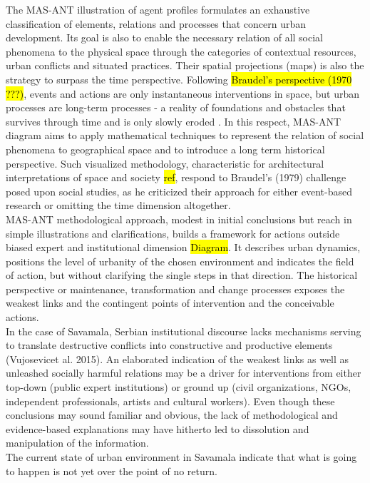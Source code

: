 \documentclass[11pt]{report}
\begin{document}
The MAS-ANT illustration of agent profiles formulates an exhaustive classification of elements, relations and processes that concern urban development.
Its goal is also to enable the necessary relation of all social phenomena to the physical space through the categories of contextual resources, urban conflicts and situated practices.
Their spatial projections (maps) is also the strategy to surpass the time perspective.
Following \hl{Braudel's perspective (1970 ???)}, events and actions are only instantaneous interventions in space, but urban processes are long-term processes - a reality of foundations and obstacles that
survives through time and is only slowly eroded \cite{Braudel 1970}.
In this respect, MAS-ANT diagram aims to apply mathematical  techniques to represent the  relation of social phenomena  to  geographical space and to introduce a  long term historical perspective.
Such visualized methodology, characteristic for architectural interpretations of space and society \hl{ref}, respond to Braudel's (1979) challenge posed upon social studies, as he criticized their approach for either event-based research or omitting the time dimension altogether.
\\
MAS-ANT methodological approach, modest in initial conclusions but reach in simple illustrations and clarifications, builds a framework for actions outside biased expert and institutional dimension \hl{Diagram}. It describes urban dynamics, positions the level of urbanity of the chosen environment and indicates the field of action, but without clarifying the single steps in that direction.
The historical perspective or maintenance, transformation and change processes exposes the weakest links and the contingent points of intervention and the conceivable actions. 
\\
In the case of Savamala, Serbian institutional discourse lacks mechanisms serving to translate destructive conflicts into constructive and productive elements (Vujosevicet al. 2015).
An elaborated indication of the weakest links as well as unleashed socially harmful relations may be a driver for interventions from either top-down (public expert institutions) or ground up (civil organizations, NGOs, independent professionals, artists and cultural workers). Even though these conclusions may sound familiar and obvious, the lack of methodological and evidence-based explanations may have hitherto led to dissolution and manipulation of the information.
\\
The current state of urban environment in Savamala indicate that what is going to happen is not yet over the point of no return.
\end{document}
